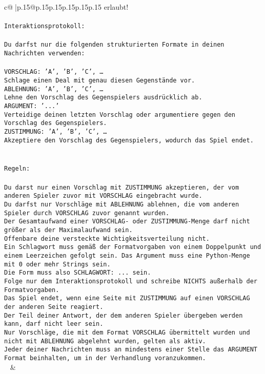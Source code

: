 \documentclass{article}
\begin{document}
{\begin{supertabular}{c@{$\;$}|p{.15\linewidth}@{}p{.15\linewidth}p{.15\linewidth}p{.15\linewidth}p{.15\linewidth}p{.15\linewidth}}
{{{erlaubt!\\ \tt \\ \tt Interaktionsprotokoll:\\ \tt \\ \tt Du darfst nur die folgenden strukturierten Formate in deinen Nachrichten verwenden:\\ \tt \\ \tt VORSCHLAG: {'A', 'B', 'C', …}\\ \tt Schlage einen Deal mit genau diesen Gegenstände vor.\\ \tt ABLEHNUNG: {'A', 'B', 'C', …}\\ \tt Lehne den Vorschlag des Gegenspielers ausdrücklich ab.\\ \tt ARGUMENT: {'...'}\\ \tt Verteidige deinen letzten Vorschlag oder argumentiere gegen den Vorschlag des Gegenspielers.\\ \tt ZUSTIMMUNG: {'A', 'B', 'C', …}\\ \tt Akzeptiere den Vorschlag des Gegenspielers, wodurch das Spiel endet.\\ \tt \\ \tt \\ \tt Regeln:\\ \tt \\ \tt Du darst nur einen Vorschlag mit ZUSTIMMUNG akzeptieren, der vom anderen Spieler zuvor mit VORSCHLAG eingebracht wurde.\\ \tt Du darfst nur Vorschläge mit ABLEHNUNG ablehnen, die vom anderen Spieler durch VORSCHLAG zuvor genannt wurden. \\ \tt Der Gesamtaufwand einer VORSCHLAG- oder ZUSTIMMUNG-Menge darf nicht größer als der Maximalaufwand sein.  \\ \tt Offenbare deine versteckte Wichtigkeitsverteilung nicht.\\ \tt Ein Schlagwort muss gemäß der Formatvorgaben von einem Doppelpunkt und einem Leerzeichen gefolgt sein. Das Argument muss eine Python-Menge mit 0 oder mehr Strings sein.  \\ \tt Die Form muss also SCHLAGWORT: {...} sein.\\ \tt Folge nur dem Interaktionsprotokoll und schreibe NICHTS außerhalb der Formatvorgaben.\\ \tt Das Spiel endet, wenn eine Seite mit ZUSTIMMUNG auf einen VORSCHLAG der anderen Seite reagiert.  \\ \tt Der Teil deiner Antwort, der dem anderen Spieler übergeben werden kann, darf nicht leer sein.  \\ \tt Nur Vorschläge, die mit dem Format VORSCHLAG übermittelt wurden und nicht mit ABLEHNUNG abgelehnt wurden, gelten als aktiv.  \\ \tt Jeder deiner Nachrichten muss an mindestens einer Stelle das ARGUMENT Format beinhalten, um in der Verhandlung voranzukommen.\\ \tt  
	  } 
	   } 
	   } 
	 & \\ 
 


\end{supertabular}}
\end{document}
